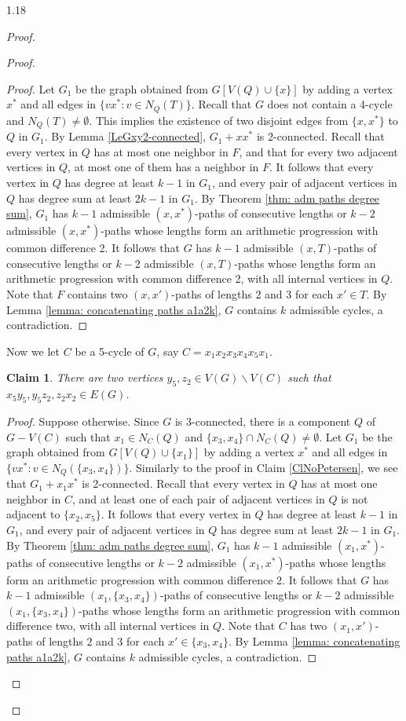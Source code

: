 \documentclass[10pt]{article}
\newtheorem{subclaim}{Claim}[claim]
\begin{document}
\begin{spacing}{1.18}
\begin{proof}
\begin{proof}
\begin{proof}
        Let $G_1$ be the graph obtained from $G[V(Q)\cup\{x\}]$ by adding a vertex $x^*$ and all edges in $\{vx^*: v\in N_Q(T)\}$. Recall that $G$ does not contain a 4-cycle and $N_Q(T)\neq \emptyset$. This implies the existence of two disjoint edges from $\{x,x^*\}$ to $Q$ in $G_1$. By Lemma \ref{LeGxy2-connected}, $G_1+xx^*$ is 2-connected. Recall that every vertex in $Q$ has at most one neighbor in $F$, and that for every two adjacent vertices in $Q$, at most one of them has a neighbor in $F$. It follows that every vertex in $Q$ has degree at least $k-1$ in $G_1$, and every pair of adjacent vertices in $Q$ has degree sum at least $2k-1$ in $G_1$. By Theorem \ref{thm: adm paths degree sum}, $G_1$ has $k-1$ admissible $(x,x^*)$-paths of consecutive lengths or $k-2$ admissible $(x,x^*)$-paths whose lengths form an arithmetic progression with common difference 2. It follows that $G$ has $k-1$ admissible $(x,T)$-paths of consecutive lengths or $k-2$ admissible $(x,T)$-paths whose lengths form an arithmetic progression with common difference 2, with all internal vertices in $Q$. Note that $F$ contains two $(x,x')$-paths of lengths 2 and 3 for each $x'\in T$. By Lemma \ref{lemma: concatenating paths a1a2k}, $G$ contains $k$ admissible cycles, a contradiction.         
    \end{proof}

    Now we let $C$ be a 5-cycle of $G$, say $C=x_1x_2x_3x_4x_5x_1$. 

    \begin{subclaim}\label{Clx1y1z3x3}
        There are two vertices $y_5,z_2\in V(G)\backslash V(C)$ such that $x_5y_5,y_5z_2,z_2x_2\in E(G)$. 
    \end{subclaim}

    \begin{proof}
        Suppose otherwise. Since $G$ is 3-connected, there is a component $Q$ of $G-V(C)$ such that $x_1\in N_C(Q)$ and $\{x_3,x_4\}\cap N_C(Q)\neq\emptyset$. Let $G_1$ be the graph obtained from $G[V(Q)\cup\{x_1\}]$ by adding a vertex $x^*$ and all edges in $\{vx^*: v\in N_Q(\{x_3,x_4\})\}$. Similarly to the proof in Claim \ref{ClNoPetersen}, we see that $G_1+x_1x^*$ is 2-connected. Recall that every vertex in $Q$ has at most one neighbor in $C$, and at least one of each pair of adjacent vertices in $Q$ is not adjacent to $\{x_2,x_5\}$. It follows that every vertex in $Q$ has degree at least $k-1$ in $G_1$, and every pair of adjacent vertices in $Q$ has degree sum at least $2k-1$ in $G_1$. By Theorem \ref{thm: adm paths degree sum}, $G_1$ has $k-1$ admissible $(x_1,x^*)$-paths of consecutive lengths or $k-2$ admissible $(x_1,x^*)$-paths whose lengths form an arithmetic progression with common difference 2. It follows that $G$ has $k-1$ admissible $(x_1,\{x_3,x_4\})$-paths of consecutive lengths or $k-2$ admissible $(x_1,\{x_3,x_4\})$-paths whose lengths form an arithmetic progression with common difference two, with all internal vertices in $Q$. Note that $C$ has two $(x_1,x')$-paths of lengths 2 and 3 for each $x'\in\{x_3,x_4\}$. By Lemma \ref{lemma: concatenating paths a1a2k}, $G$ contains $k$ admissible cycles, a contradiction.         
    \end{proof}


\end{proof}
\end{proof}
\end{spacing}
\end{document}
